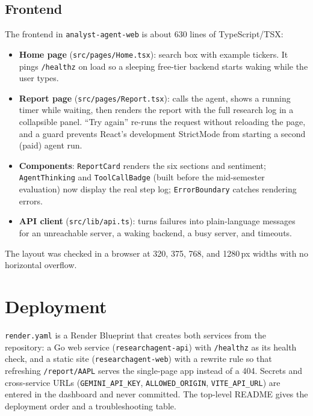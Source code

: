 \documentclass[12pt,a4paper,oneside]{report}
\begin{document}
\subsection{Frontend}
The frontend in \texttt{analyst-agent-web} is about 630 lines of TypeScript/TSX:
\begin{itemize}[leftmargin=*]
\item \textbf{Home page} (\texttt{src/pages/Home.tsx}): search box with example tickers. It pings \texttt{/healthz} on load so a sleeping free-tier backend starts waking while the user types.
\item \textbf{Report page} (\texttt{src/pages/Report.tsx}): calls the agent, shows a running timer while waiting, then renders the report with the full research log in a collapsible panel. ``Try again'' re-runs the request without reloading the page, and a guard prevents React's development StrictMode from starting a second (paid) agent run.
\item \textbf{Components}: \texttt{ReportCard} renders the six sections and sentiment; \texttt{AgentThinking} and \texttt{ToolCallBadge} (built before the mid-semester evaluation) now display the real step log; \texttt{ErrorBoundary} catches rendering errors.
\item \textbf{API client} (\texttt{src/lib/api.ts}): turns failures into plain-language messages for an unreachable server, a waking backend, a busy server, and timeouts.
\end{itemize}
The layout was checked in a browser at 320, 375, 768, and 1280\,px widths with no horizontal overflow.

\section{Deployment}
\texttt{render.yaml} is a Render Blueprint that creates both services from the repository: a Go web service (\texttt{researchagent-api}) with \texttt{/healthz} as its health check, and a static site (\texttt{researchagent-web}) with a rewrite rule so that refreshing \texttt{/report/AAPL} serves the single-page app instead of a 404. Secrets and cross-service URLs (\texttt{GEMINI\_API\_KEY}, \texttt{ALLOWED\_ORIGIN}, \texttt{VITE\_API\_URL}) are entered in the dashboard and never committed. The top-level README gives the deployment order and a troubleshooting table.
\end{document}
